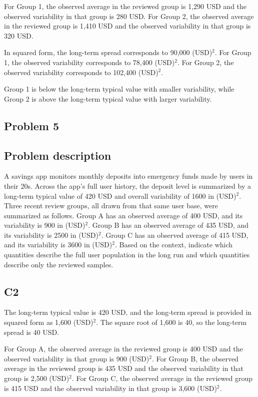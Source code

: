 \begin{ExamProblems}
		For Group 1, the observed average in the reviewed group is 1,290 USD and the observed variability in that group is 280 USD.
		For Group 2, the observed average in the reviewed group is 1,410 USD and the observed variability in that group is 320 USD.

		In squared form, the long-term spread corresponds to 90,000 (USD)$^2$.
		For Group 1, the observed variability corresponds to 78,400 (USD)$^2$.
		For Group 2, the observed variability corresponds to 102,400 (USD)$^2$.

		Group 1 is below the long-term typical value with smaller variability, while Group 2 is above the long-term typical value with larger variability.


		\newpage
		\item
		\subsection*{Problem 5}
		\subsection*{Problem description}
		A savings app monitors monthly deposits into emergency funds made by users in their 20s.
		Across the app's full user history, the deposit level is summarized by a long-term typical value of 420 USD and overall variability of 1600 in (USD)$^2$.
		Three recent review groups, all drawn from that same user base, were summarized as follows.
		Group A has an observed average of 400 USD, and its variability is 900 in (USD)$^2$.
		Group B has an observed average of 435 USD, and its variability is 2500 in (USD)$^2$.
		Group C has an observed average of 415 USD, and its variability is 3600 in (USD)$^2$.
		Based on the context, indicate which quantities describe the full user population in the long run and which quantities describe only the reviewed samples.

\subsection*{C2}
		The long-term typical value is 420 USD, and the long-term spread is provided in squared form as 1,600 (USD)$^2$.
		The square root of 1,600 is 40, so the long-term spread is 40 USD.

		For Group A, the observed average in the reviewed group is 400 USD and the observed variability in that group is 900 (USD)$^2$.
		For Group B, the observed average in the reviewed group is 435 USD and the observed variability in that group is 2,500 (USD)$^2$.
		For Group C, the observed average in the reviewed group is 415 USD and the observed variability in that group is 3,600 (USD)$^2$.


\end{ExamProblems}
